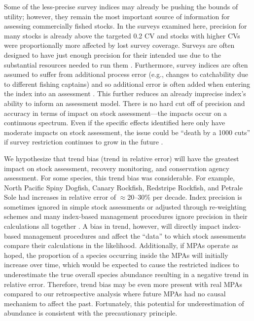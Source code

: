 \documentclass[12pt]{article}
\begin{document}
Some of the less-precise survey indices may already be pushing the bounds of utility; however, they remain the most important source of information for assessing commercially fished stocks.
In the surveys examined here, precision for many stocks is already above the targeted \citep{sinclair2003syn} 0.2 CV and stocks with higher CVs were proportionally more affected by lost survey coverage.
Surveys are often designed to have just enough precision for their intended use due to the substantial resources needed to run them \citep{hilbornwalters1992}.
Furthermore, survey indices are often assumed to suffer from additional process error (e.g., changes to catchability due to different fishing captains) and so additional error is often added when entering the index into an assessment \citep{pennington1994, francis2003}. 
This further reduces an already imprecise index's ability to inform an assessment model.
There is no hard cut off of precision and accuracy in terms of impact on stock assessment---the impacts occur on a continuous spectrum.
Even if the specific effects identified here only have moderate impacts on stock assessment, the issue could be ``death by a 1000 cuts'' if survey restriction continues to grow in the future \citep{benoit2020national}.

We hypothesize that trend bias (trend in relative error) will have the greatest impact on stock assessment, recovery monitoring, and conservation agency assessment.
For some species, this trend bias was considerable.
For example, North Pacific Spiny Dogfish, Canary Rockfish, Redstripe Rockfish, and Petrale Sole had increases in relative error of $\approx$20--30\% per decade.
Index precision is sometimes ignored in simple stock assessments \citep{free2020} or adjusted through re-weighting schemes \citep{francis2011} and many index-based management procedures ignore precision in their calculations all together \citep{carruthers2016}.
A bias in trend, however, will directly impact index-based management procedures and affect the ``data'' to which stock assessments compare their calculations in the likelihood.
Additionally, if MPAs operate as hoped, the proportion of a species occurring inside the MPAs will initially increase over time, which would be expected to cause the restricted indices to underestimate the true overall species abundance resulting in a negative trend in relative error.
Therefore, trend bias may be even more present with real MPAs compared to our retrospective analysis where future MPAs had no causal mechanism to affect the past.
Fortunately, this potential for underestimation of abundance is consistent with the precautionary principle.
\end{document}
